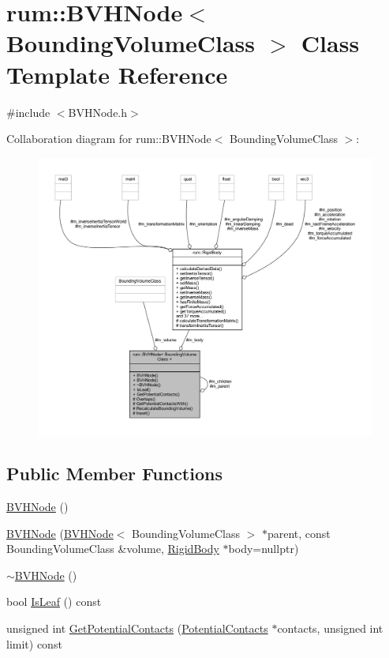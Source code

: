\hypertarget{classrum_1_1_b_v_h_node}{}\section{rum\+:\+:B\+V\+H\+Node$<$ Bounding\+Volume\+Class $>$ Class Template Reference}
\label{classrum_1_1_b_v_h_node}


{\ttfamily \#include $<$B\+V\+H\+Node.\+h$>$}



Collaboration diagram for rum\+:\+:B\+V\+H\+Node$<$ Bounding\+Volume\+Class $>$\+:\nopagebreak
\begin{figure}[H]
\begin{center}
\leavevmode
\includegraphics[width=350pt]{classrum_1_1_b_v_h_node__coll__graph}
\end{center}
\end{figure}
\subsection*{Public Member Functions}
\begin{DoxyCompactItemize}
\item 
\hyperlink{classrum_1_1_b_v_h_node_aca2a55118d5c021f92b8e0105fa32625}{B\+V\+H\+Node} ()
\item 
\hyperlink{classrum_1_1_b_v_h_node_a4d6bef35007d6473eefe2ce8979e2e2c}{B\+V\+H\+Node} (\hyperlink{classrum_1_1_b_v_h_node}{B\+V\+H\+Node}$<$ Bounding\+Volume\+Class $>$ $\ast$parent, const Bounding\+Volume\+Class \&volume, \hyperlink{classrum_1_1_rigid_body}{Rigid\+Body} $\ast$body=nullptr)
\item 
\hyperlink{classrum_1_1_b_v_h_node_a97283b0dd8f0cf52762da014a94ade0b}{$\sim$\+B\+V\+H\+Node} ()
\item 
bool \hyperlink{classrum_1_1_b_v_h_node_ad916d1d80373a61b95d99d6ae7472007}{Is\+Leaf} () const
\item 
unsigned int \hyperlink{classrum_1_1_b_v_h_node_a951e91e4c58802cb843e5b0a146c4eb1}{Get\+Potential\+Contacts} (\hyperlink{structrum_1_1_potential_contacts}{Potential\+Contacts} $\ast$contacts, unsigned int limit) const
\end{DoxyCompactItemize}
